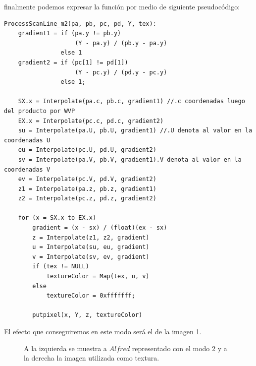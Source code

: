 \documentclass[a4paper]{article}
\begin{document}
\par finalmente podemos expresar la función por medio de siguiente pseudocódigo: 
\begin{verbatim}
ProcessScanLine_m2(pa, pb, pc, pd, Y, tex):
    gradient1 = if (pa.y != pb.y) 
                    (Y - pa.y) / (pb.y - pa.y)
                else 1                          
    gradient2 = if (pc[1] != pd[1]) 
                    (Y - pc.y) / (pd.y - pc.y)
                else 1;
            
    SX.x = Interpolate(pa.c, pb.c, gradient1) //.c coordenadas luego del producto por WVP
    EX.x = Interpolate(pc.c, pd.c, gradient2)
    su = Interpolate(pa.U, pb.U, gradient1) //.U denota al valor en la coordenadas U
    eu = Interpolate(pc.U, pd.U, gradient2)
    sv = Interpolate(pa.V, pb.V, gradient1).V denota al valor en la coordenadas V
    ev = Interpolate(pc.V, pd.V, gradient2)
    z1 = Interpolate(pa.z, pb.z, gradient1)
    z2 = Interpolate(pc.z, pd.z, gradient2)
   
    for (x = SX.x to EX.x)
        gradient = (x - sx) / (float)(ex - sx)
        z = Interpolate(z1, z2, gradient)
        u = Interpolate(su, eu, gradient)
        v = Interpolate(sv, ev, gradient)
        if (tex != NULL)
            textureColor = Map(tex, u, v)
        else
            textureColor = 0xfffffff;
    
        putpixel(x, Y, z, textureColor)
\end{verbatim}

El efecto que conseguiremos en este modo será el de la imagen \ref{modo2}.


\begin{figure}[h!]
 \centering
  \caption{A la izquierda se muestra a $Alfred$ representado con el modo 2 y a la derecha la imagen utilizada como textura.}
 \label{modo2}
\end{figure} 
\end{document}
